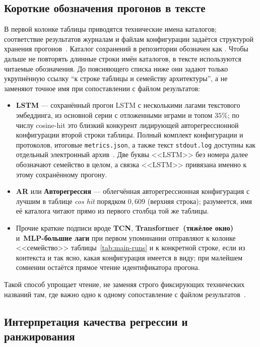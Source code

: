 \subsection{Короткие обозначения прогонов в тексте}

В первой колонке таблицы приводятся технические имена каталогов; соответствие результатов журналам и файлам конфигурации задаётся структурой хранения прогонов~. Каталог сохранений в репозитории обозначен как . Чтобы дальше не повторять длинные строки имён каталогов, в тексте используются читаемые обозначения. До поясняющего списка ниже они задают только укрупнённую ссылку ``к строке таблицы и семейству архитектуры'', а не заменяют точное имя при сопоставлении с файлом результатов:

\begin{itemize}
	\item \textbf{LSTM} --- сохранённый прогон LSTM с несколькими лагами текстового эмбеддинга, из основной серии с отложенными играми и топом $35$\%; по числу cosine-hit это близкий конкурент лидирующей авторегрессионной конфигурации второй строки таблицы. Полный комплект конфигурации и протоколов, итоговые \texttt{metrics.json}, а также текст \texttt{stdout.log} доступны как отдельный электронный архив~. Две буквы <<LSTM>> без номера далее обозначают семейство в целом, а связка <<LSTM>> привязана именно к этому сохранённому прогону.
	\item \textbf{AR} или \textbf{Авторегрессия} --- облегчённая авторегрессионная конфигурация с лучшим в таблице \textit{cos hit} порядком $0{,}609$ (верхняя строка); разумеется, имя её каталога читают прямо из первого столбца той же таблицы.
	\item Прочие краткие подписи вроде \textbf{TCN}, \textbf{Transformer~(тяжёлое окно)} и~\textbf{MLP-большие лаги} при первом упоминании отправляют к колонке <<семейство>> таблицы~\ref{tab:main-runs} и к конкретной строке, если из контекста и так ясно, какая конфигурация имеется в виду; при малейшем сомнении остаётся прямое чтение идентификатора прогона.
\end{itemize}

Такой способ упрощает чтение, не заменяя строго фиксирующих технических названий там, где важно одно к одному сопоставление с файлом результатов~.

\subsection{Интерпретация качества регрессии и ранжирования}

